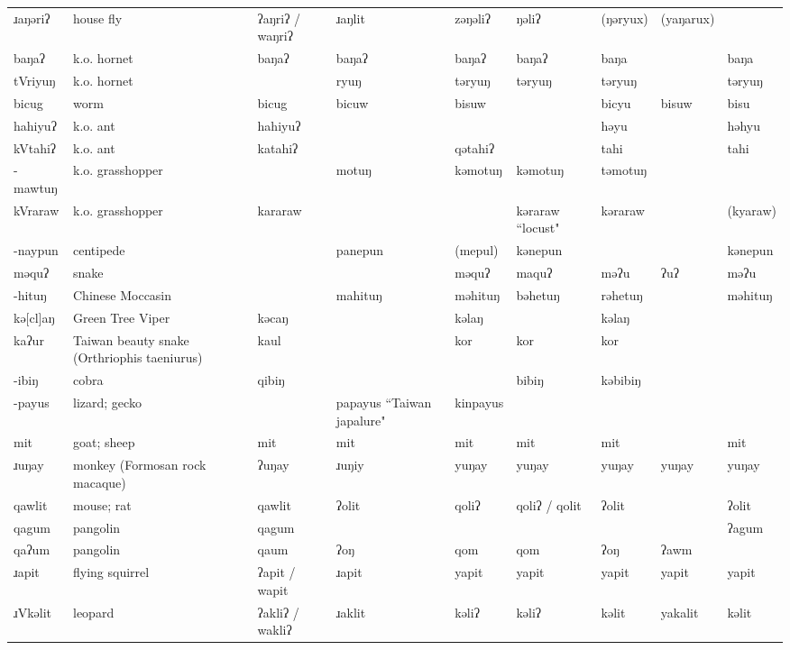 \begin{landscape}
\begin{longtable}{*{9}{p{}}}
\text{*}ɹaŋəriʔ & house fly & ʔaŋriʔ / waŋriʔ & ɹaŋlit & zəŋəliʔ & ŋəliʔ & (ŋəryux) & (yaŋarux) & \\
\text{*}baŋaʔ & k.o. hornet & baŋaʔ & baŋaʔ & baŋaʔ & baŋaʔ & baŋa &  & baŋa\\
\text{*}tVriyuŋ & k.o. hornet &  & ryuŋ & təryuŋ & təryuŋ & təryuŋ &  & təryuŋ\\
\text{*}bicug & worm & bicug & bicuw & bisuw &  & bicyu & bisuw & bisu\\
\text{*}hahiyuʔ & k.o. ant & hahiyuʔ &  &  &  & həyu &  & həhyu\\
\text{*}kVtahiʔ & k.o. ant & katahiʔ &  & qətahiʔ &  & tahi &  & tahi\\
\text{*}-mawtuŋ & k.o. grasshopper &  & motuŋ & kəmotuŋ & kəmotuŋ & təmotuŋ &  & \\
\text{*}kVraraw & k.o. grasshopper & kararaw &  &  & kəraraw ``locust" & kəraraw &  & (kyaraw)\\
\text{*}-naypun & centipede &  & panepun & (mepul) & kənepun &  &  & kənepun\\
\text{*}məquʔ & snake &  &  & məquʔ & maquʔ & məʔu & ʔuʔ & məʔu\\
\text{*}-hituŋ & Chinese Moccasin &  & mahituŋ & məhituŋ & bəhetuŋ & rəhetuŋ &  & məhituŋ\\
\text{*}kə[cl]aŋ & Green Tree Viper & kəcaŋ &  & kəlaŋ &  & kəlaŋ &  & \\
\text{*}kaʔur & Taiwan beauty snake (Orthriophis taeniurus) & kaul &  & kor & kor & kor &  & \\
\text{*}-ibiŋ & cobra & qibiŋ &  &  & bibiŋ & kəbibiŋ &  & \\
\text{*}-payus & lizard; gecko &  & papayus ``Taiwan japalure" & kinpayus &  &  &  & \\
\text{*}mit & goat; sheep & mit & mit & mit & mit & mit &  & mit\\
\text{*}ɹuŋay & monkey (Formosan rock macaque) & ʔuŋay & ɹuŋiy & yuŋay & yuŋay & yuŋay & yuŋay & yuŋay\\
\text{*}qawlit & mouse; rat & qawlit & ʔolit & qoliʔ & qoliʔ / qolit & ʔolit &  & ʔolit\\
\text{*}qagum & pangolin & qagum &  &  &  &  &  & ʔagum\\
\text{*}qaʔum & pangolin & qaum & ʔoŋ & qom & qom & ʔoŋ & ʔawm & \\
\text{*}ɹapit & flying squirrel & ʔapit / wapit & ɹapit & yapit & yapit & yapit & yapit & yapit\\
\text{*}ɹVkəlit & leopard & ʔakliʔ / wakliʔ & ɹaklit & kəliʔ & kəliʔ & kəlit & yakalit & kəlit\\

\end{longtable}
\end{landscape}
